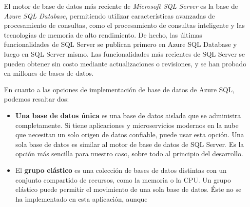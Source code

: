 El motor de base de datos más reciente de \textit{Microsoft SQL Server} es la base de
\textit{Azure SQL Database}, permitiendo utilizar características avanzadas de procesamiento de
consultas, como el procesamiento de consultas inteligente y las tecnologías de
memoria de alto rendimiento. De hecho, las últimas funcionalidades de SQL Server
se publican primero en Azure SQL Database y luego en SQL Server mismo. Las
funcionalidades más recientes de SQL Server se pueden obtener sin costo mediante
actualizaciones o revisiones, y se han probado en millones de bases de datos.


En cuanto a las opciones de implementación de base de datos de Azure SQL, podemos resaltar dos:
\begin{itemize}
    \item \textbf{Una base de datos única} es una base de datos aislada que se
    administra completamente. Si tiene aplicaciones y microservicios modernos en
    la nube que necesitan un solo origen de datos confiable, puede usar esta
    opción. Una sola base de datos es similar al motor de base de datos de SQL
    Server. Es la opción más sencilla para nuestro caso, sobre todo al principio
    del desarrollo.
    \item El \textbf{grupo elástico} es una colección de bases de datos distintas con un
    conjunto compartido de recursos, como la memoria o la CPU. Un grupo elástico
    puede permitir el movimiento de una sola base de datos. Éste no se ha implementado en esta aplicación, aunque 
\end{itemize}

